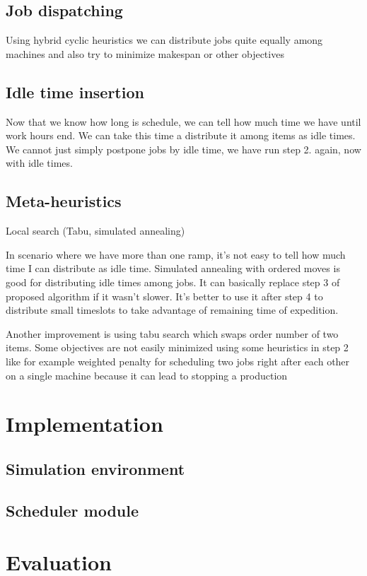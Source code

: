 \documentclass{ctuthesis}
\begin{document}
\section{Job dispatching}

Using hybrid cyclic heuristics we can distribute jobs quite equally among machines and also try to minimize makespan or other objectives

\section{Idle time insertion}

Now that we know how long is schedule, we can tell how much time we have until work hours end. We can take this time a distribute it among items as idle times. We cannot just simply postpone jobs by idle time, we have run step 2. again, now with idle times.

\section{Meta-heuristics}
Local search (Tabu, simulated annealing)

In scenario where we have more than one ramp, it's not easy to tell how much time I can distribute as idle time. Simulated annealing with ordered moves is good for distributing idle times among jobs. It can basically replace step 3 of proposed algorithm if it wasn't slower. It's better to use it after step 4 to distribute small timeslots to take advantage of remaining time of expedition.

Another improvement is using tabu search which swaps order number of two items. Some objectives are not easily minimized using some heuristics in step 2 like for example weighted penalty for scheduling two jobs right after each other on a single machine because it can lead to stopping a production

\chapter{Implementation}
\section{Simulation environment}
\section{Scheduler module}
\chapter{Evaluation}
\label{ch:Evaluation}
\end{document}
